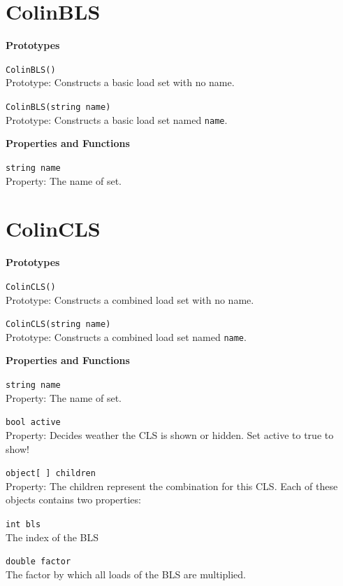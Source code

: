 \begin{trivlist}
\section{ColinBLS}
\label{sec:jsColinBLS}
\begin{trivlist}
\item[]\textbf{Prototypes}
	\begin{trivlist}
		\leftskip=1cm
		\item[] \texttt{ColinBLS()}\\Prototype: Constructs a basic load set with no name.
		\item[] \texttt{ColinBLS(string name)}\\Prototype: Constructs a basic load set named \texttt{name}.
	\end{trivlist}
\item[]\textbf{Properties and Functions}
	\begin{trivlist}
		\leftskip=1cm
		\item[] \texttt{string name}\\Property: The name of set.
	\end{trivlist}
\end{trivlist}

\section{ColinCLS}
\label{sec:jsColinCLS}
\item[]\textbf{Prototypes}
	\begin{trivlist}
		\leftskip=1cm
		\item[] \texttt{ColinCLS()}\\Prototype: Constructs a combined load set with no name.
		\item[] \texttt{ColinCLS(string name)}\\Prototype: Constructs a combined load set named \texttt{name}.
	\end{trivlist}
\item[]\textbf{Properties and Functions}
	\begin{trivlist}
		\leftskip=1cm
		\item[] \texttt{string name}\\Property: The name of set.
		\item[] \texttt{bool active}\\Property: Decides weather the CLS is shown or hidden. Set active to true to show!
		\item[] \texttt{object[\ ] children}\\Property: The children represent the combination for this CLS. Each of these objects contains two properties:
		\begin{trivlist}
			\leftskip=2cm
			\item[]\texttt{int bls}\\The index of the BLS
			\item[]\texttt{double factor}\\The factor by which all loads of the BLS are multiplied.
		\end{trivlist}
	\end{trivlist}
\end{trivlist}

